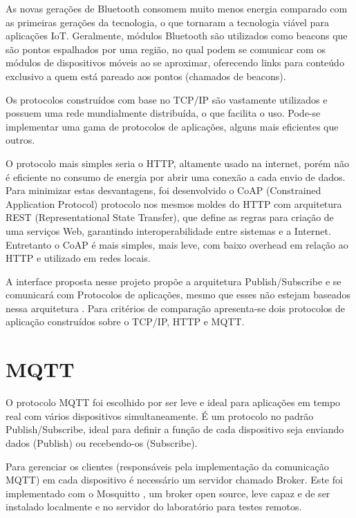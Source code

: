 As novas gerações de Bluetooth consomem muito menos energia comparado com as primeiras gerações da tecnologia, o que tornaram a tecnologia viável para aplicações IoT. Geralmente, módulos Bluetooth são utilizados como beacons \cite{Endeavor:Beacons} que são  pontos espalhados por uma região, no qual podem se comunicar com os módulos de dispositivos móveis ao se aproximar, oferecendo links para conteúdo exclusivo a quem está pareado aos pontos (chamados de beacons).

Os protocolos construídos com base no TCP/IP são vastamente utilizados e possuem uma rede mundialmente distribuída, o que facilita o uso. Pode-se implementar uma gama de protocolos de aplicações, alguns mais eficientes que outros.

O protocolo mais simples seria o HTTP, altamente usado na internet, porém não é eficiente no consumo de energia por abrir uma conexão a cada envio de dados. Para minimizar estas desvantagens, foi desenvolvido o CoAP (Constrained Application Protocol) \cite{coap} protocolo nos mesmos moldes do HTTP com arquitetura REST (Representational State Transfer), que define as regras para criação de uma serviços Web, garantindo interoperabilidade entre sistemas e a Internet. Entretanto o CoAP é mais simples, mais leve, com baixo overhead em relação ao HTTP e utilizado em redes locais.

A interface proposta nesse projeto propõe a arquitetura Publish/Subscribe e se comunicará com Protocolos de aplicações, mesmo que esses não estejam baseados nessa arquitetura . Para critérios de comparação apresenta-se dois protocolos de aplicação construídos sobre o TCP/IP, HTTP e MQTT.

\section{MQTT}
\label{section:mqtt}

O protocolo MQTT foi escolhido por ser leve e ideal para aplicações em tempo real com vários dispositivos simultaneamente. É um protocolo no padrão Publish/Subscribe, ideal para definir a função de cada dispositivo seja enviando dados (Publish) ou recebendo-os (Subscribe).

Para gerenciar os clientes (responsáveis pela implementação da comunicação MQTT) em cada dispositivo é necessário um servidor chamado Broker. Este foi implementado com o Mosquitto \cite{mosquitto}, um broker open source, leve capaz e de ser instalado localmente e no servidor do laboratório para testes remotos.

